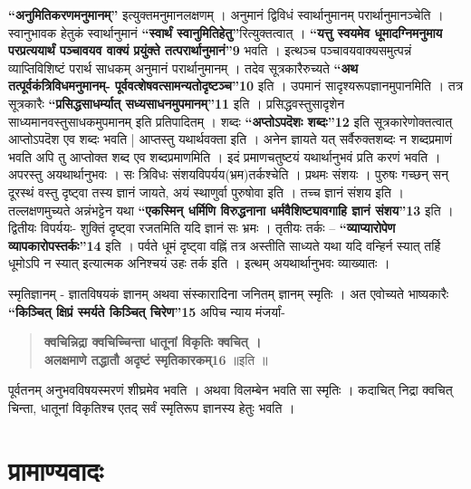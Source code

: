 {\textbf{“अनुमितिकरणमनुमानम्”} इत्युक्तमनुमानलक्षणम् । अनुमानं द्विविधं स्वार्थानुमानम् परार्थानुमानञ्चेति । स्वानुभावक हेतुकं स्वार्थानुमानं \textbf{“स्वार्थं स्वानुमितिहेतु”}रित्युक्तत्वात् । \textbf{“यत्तु स्वयमेव धूमादग्निमनुमाय परप्रत्ययार्थं पञ्चावयव वाक्यं प्रयुंक्ते तत्परार्थानुमानं”9} भवति । इत्थञ्च पञ्चावयवाक्यसमुत्पन्नं व्याप्तिविशिष्टं परार्थ साधकम् अनुमानं परार्थानुमानम् । तदेव सूत्रकारैरुच्यते \textbf{“अथ तत्पूर्वकंत्रिविधमनुमानम्- पूर्ववत्शेषवत्सामन्यतोदृष्टञ्च”10} इति । उपमानं सादृश्यरूपज्ञानमुपानमिति । तत्र सूत्रकारैः \textbf{“प्रसिद्धसाधर्म्यात् सध्यसाधनमुपमानम्”11} इति । प्रसिद्धवस्तुसादृशेन साध्यमानवस्तुसाधकमुपमानम् इति प्रतिपादितम् । शब्दः \textbf{“अप्तोऽपदॆशः शब्दः”12} इति सूत्रकारेणोक्तत्वात् आप्तोऽपदॆश एव शब्दः भवति | आप्तस्तु यथार्थवक्ता इति । अनेन ज्ञायते यत् सर्वैरुक्तशब्दः न शब्दप्रमाणं भवति अपि तु आप्तोक्त शब्द एव शब्दप्रमाणमिति । इदं प्रमाणचतुष्टयं यथार्थानुभवं प्रति करणं भवति । अपरस्तु अयथार्थानुभवः । सः त्रिविधः संशयविपर्यय(भ्रम)तर्कश्चेति । प्रथमः संशयः । पुरुषः गच्छन् सन् दूरस्थं वस्तु दृष्ट्वा तस्य ज्ञानं जायते, अयं स्थाणुर्वा पुरुषोवा इति । तच्च ज्ञानं संशय इति । तल्लक्षणमुच्यते अन्नंभट्टेन यथा \textbf{“एकस्मिन् धर्मिणि विरुद्धनाना धर्मवैशिष्ट्यावगाहि ज्ञानं संशय”13} इति । द्वितीयः विपर्ययः- शुक्तिं दृष्ट्वा रजतमिति यदि ज्ञानं सः भ्रमः । तृतीयः तर्कः – \textbf{“व्याप्यारोपेण व्यापकारोपस्तर्कः”14} इति । पर्वते धूमं दृष्ट्वा वह्निं तत्र अस्तीति साध्यते यथा यदि वन्हिर्न स्यात् तर्हि धूमोऽपि न स्यात् इत्यात्मक अनिश्चयं उहः तर्क इति । इत्थम् अयथार्थानुभवः व्याख्यातः ।

स्मृतिज्ञानम् - ज्ञातविषयकं ज्ञानम् अथवा संस्कारादिना जनितम् ज्ञानम् स्मृतिः । अत एवोच्यते भाष्यकारैः \textbf{“किञ्चित् क्षिप्रं स्मर्यते किञ्चित् चिरेण”15} अपिच न्याय मंजर्यां-
\begin{verse}
\textbf{क्वचिन्निद्रा क्वचिच्चिन्ता धातूनां विकृतिः क्वचित् ।\\
अलक्षमाणे तद्धातौ अदृष्टं स्मृतिकारकम्16} ॥इति ॥
\end{verse}
पूर्वतनम् अनुभवविषयस्मरणं शीघ्रमेव भवति । अथवा विलम्बेन भवति सा स्मृतिः । कदाचित् निद्रा क्वचित् चिन्ता, धातूनां विकृतिश्च एतद् सर्वं स्मृतिरूप ज्ञानस्य हेतुः भवति ।

\section*{प्रामाण्यवादः}

}
